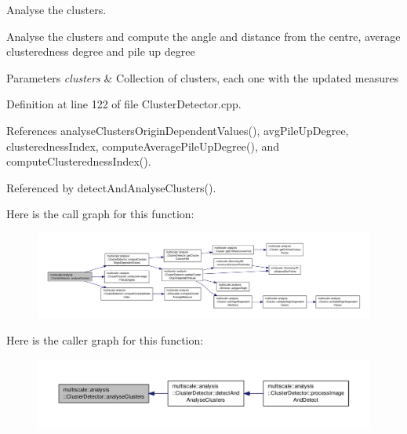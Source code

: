 Analyse the clusters. 

Analyse the clusters and compute the angle and distance from the centre, average clusteredness degree and pile up degree


\begin{DoxyParams}{Parameters}
{\em clusters} & Collection of clusters, each one with the updated measures \\
\hline
\end{DoxyParams}


Definition at line 122 of file Cluster\-Detector.\-cpp.



References analyse\-Clusters\-Origin\-Dependent\-Values(), avg\-Pile\-Up\-Degree, clusteredness\-Index, compute\-Average\-Pile\-Up\-Degree(), and compute\-Clusteredness\-Index().



Referenced by detect\-And\-Analyse\-Clusters().



Here is the call graph for this function\-:\nopagebreak
\begin{figure}[H]
\begin{center}
\leavevmode
\includegraphics[width=350pt]{classmultiscale_1_1analysis_1_1ClusterDetector_af994e960ba3cd76cc67e714ea276264a_cgraph}
\end{center}
\end{figure}




Here is the caller graph for this function\-:\nopagebreak
\begin{figure}[H]
\begin{center}
\leavevmode
\includegraphics[width=350pt]{classmultiscale_1_1analysis_1_1ClusterDetector_af994e960ba3cd76cc67e714ea276264a_icgraph}
\end{center}
\end{figure}


